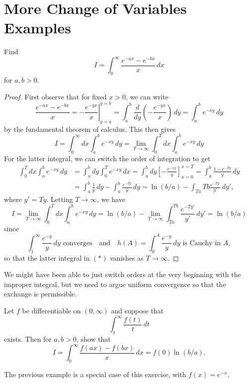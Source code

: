 \section{More Change of Variables Examples}
\begin{example}
  Find
  \[
    I = \int_0^\infty \frac{e^{-ax} - e^{-bx}}{x}\, dx
  \]
  for $a, b > 0$.
\end{example}

\begin{proof}
  First observe that for fixed $x > 0$, we can write
  \[
    \frac{e^{-ax} - e^{-bx}}{x} = \left.-\frac{e^{-yx}}{x}\right|_{y = a}^{y = b}
      = \int_a^b \frac{d}{dy} (-\frac{e^{-yx}}{x})\, dy
      = \int_a^b e^{-xy}\, dy
  \]
  by the fundamental theorem of calculus.
  This then gives
  \[
    I = \int_0^\infty dx \int_a^b e^{-xy}\, dy
    = \lim_{T \to \infty} \int_0^T dx \int_a^b e^{-xy}\, dy
  \]
  For the latter integral, we can switch the order of
  integration to get
  \begin{align*}
    \int_0^T dx \int_a^b e^{-xy}\, dy
    &= \int_a^b dy \int_0^T e^{-xy}\, dx
    = \int_a^b dy \left[-\frac{e^{-xy}}{y}\right]_{x = 0}^{x = T}
    = \int_a^b \frac{1 - e^{-Ty}}{y}\, dy \\
    &= \int_a^b \frac{1}{y}\, dy - \int_a^b \frac{e^{-Ty}}{y}\, dy
    = \ln(b / a) - \int_{Ta}{Tb} \frac{e^{-Ty'}}{y'}\, dy',
  \end{align*}
  where $y' = Ty$. Letting $T \to \infty$, we have
  \[
    I = \lim_{T \to \infty} \int_0^T dx \int_a^b e^{-xy}\, dy
    = \ln(b / a) - \lim_{T \to \infty} \int_{Ta}^{Tb} \frac{e^{-Ty'}}{y'}\, dy'
    = \ln(b / a) \tag{$*$}
  \]
  since
  \[
    \int_1^\infty \frac{e^{-y}}{y}\, dy
    \text{ converges} \quad \text{and} \quad
    h(A) = \int_0^A \frac{e^{-y}}{y}\, dy \text{ is Cauchy in $A$},
  \]
  so that the latter integral in $(*)$ vanishes as
  $T \to \infty$.
\end{proof}

\begin{remark}
  We might have been able to just switch orders at the
  very beginning with the improper integral, but we need
  to argue uniform
  convergence so that the exchange is permissible.
\end{remark}

\begin{exercise}
  Let $f$ be differentiable on $(0, \infty)$ and suppose
  that
  \[
    \int_1^\infty \frac{f(t)}{t}\, dt
  \]
  exists. Then for $a, b > 0$, show that
  \[
    I = \int_0^\infty \frac{f(ax) - f(bx)}{x}\, dx
    = f(0) \ln(b / a).
  \]
\end{exercise}

\begin{remark}
  The previous example is a special case of this exercise,
  with $f(x) = e^{-x}$.
\end{remark}
